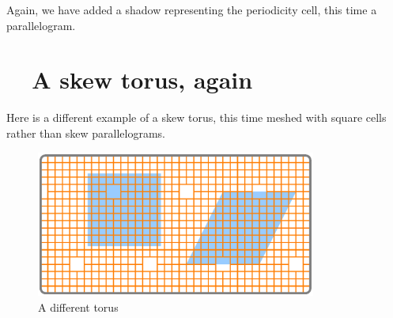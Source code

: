Again, we have added a shadow representing the periodicity cell, this time a parallelogram.


\section{~~A skew torus, again}\label{\numb section 7.\numb parag 8}

Here is a different example of a skew torus, this time meshed with square cells
rather than skew parallelograms.

\begin{figure}[ht] \centering
  \includegraphics[width=92mm]{flat-torus-4.eps}
  \caption{A different torus}
  \label{\numb section 7.\numb fig 4}
\end{figure}


